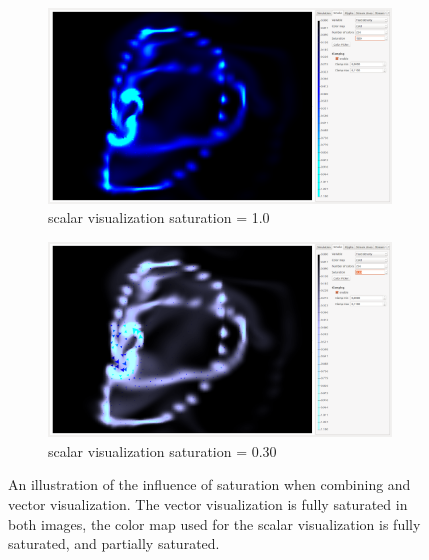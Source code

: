 \begin{figure}[tb]
	\centering
	\begin{subfigure}[t]{0.4\textwidth}
		\centering
		\includegraphics[width=\textwidth, trim={50px 200px 1023px 300px}, clip]{colormapping/img/nosaturation}
		\caption{scalar visualization saturation = 1.0}
		\label{fig:colormapping:saturation:disabled}
	\end{subfigure}
	\hspace{50px}
	\begin{subfigure}[t]{0.4\textwidth}
		\centering
		\includegraphics[width=\textwidth, trim={50px 200px 1023px 300px}, clip]{colormapping/img/saturation}
		\caption{scalar visualization saturation = 0.30}
		\label{fig:colormapping:saturation:enabled}
	\end{subfigure}	
	\caption{An illustration of the influence of saturation when combining \smoke and vector visualization. The vector visualization is fully saturated in both images, the color map used for the scalar visualization is  fully saturated, and  partially saturated.}
	\label{fig:colormaps:saturation}
\end{figure}

